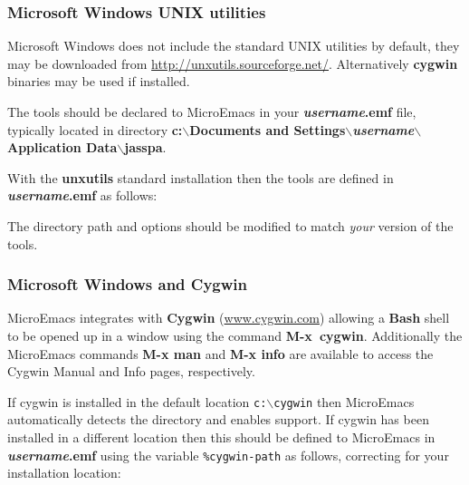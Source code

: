 \documentclass[11pt,a4paper,pdftex]{article}
\begin{document}
\subsubsection{Microsoft Windows UNIX utilities}

  Microsoft Windows does not include the standard UNIX utilities by default,
  they may be downloaded from
  \href{http://unxutils.sourceforge.net/}{http://unxutils.sourceforge.net/}.
  Alternatively \textbf{cygwin} binaries may be used if installed.

  The tools should be declared to MicroEmacs in your
  \textbf{\textit{username}.emf} file, typically located in directory
  \textbf{c:$\backslash$Documents and
  Settings$\backslash$\textit{username}$\backslash$Application
  Data$\backslash$jasspa}. 

  With the \textbf{unxutils} standard installation
  then the tools are defined in \textbf{\textit{username}.emf} as follows:


  The directory path and options should be modified to match \textit{your}
  version of the tools.

\subsubsection{Microsoft Windows and Cygwin}

  MicroEmacs integrates with \textbf{Cygwin}
  (\href{http://www.cygwin.com}{www.cygwin.com}) allowing a \textbf{Bash}
  shell to be opened up in a window using the command \textbf{M-x\ cygwin}.
  Additionally the MicroEmacs commands \textbf{M-x man} and \textbf{M-x
  info} are available to access the Cygwin Manual and Info pages,
  respectively.

  If cygwin is installed in the default location \texttt{c:$\backslash$cygwin}
  then MicroEmacs automatically detects the directory and enables support. If
  cygwin has been installed in a different location then this should be
  defined to MicroEmacs in \textbf{\textit{username}.emf} using the variable 
  \texttt{\%cygwin-path} as follows, correcting for your installation location:
   
\end{document}
